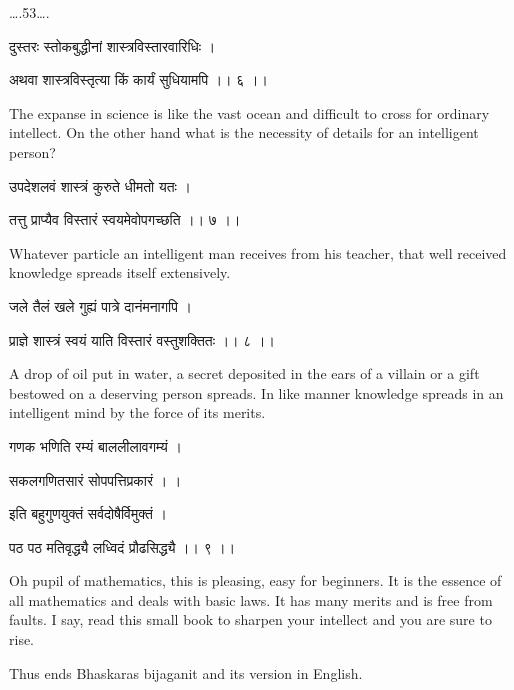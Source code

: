 \documentclass[]{article}
\date{}
\begin{document}
{\ldots{}.53\ldots{}.}

{दुस्तरः स्तोकबुद्धीनां शास्त्रविस्तारवारिधिः । }

{अथवा शास्त्रविस्तृत्या किं कार्यं सुधियामपि ।। ६ ।। }

{The expanse in science is like the vast ocean and difficult to cross
for ordinary intellect. On the other hand what is the necessity of
details for an intelligent person?}

{उपदेशलवं शास्त्रं कुरुते धीमतो यतः । }

{तत्तु प्राप्यैव विस्तारं स्वयमेवोपगच्छति ।। ७ ।। }

{Whatever particle an intelligent man receives from his teacher, that
well received knowledge spreads itself extensively.}

{जले तैलं खले गुह्यं पात्रे दानंमनागपि । }

{प्राज्ञे शास्त्रं स्वयं याति विस्तारं वस्तुशक्तितः ।। ८ ।। }

{A drop of oil put in water, a secret deposited in the ears of a villain
or a gift bestowed on a deserving person spreads. In like manner
knowledge spreads in an intelligent mind by the force of its merits.}

{गणक भणिति रम्यं बाललीलावगम्यं । }

{सकलगणितसारं सोपपत्तिप्रकारं । । }

{इति बहुगुणयुक्तं सर्वदोषैर्विमुक्तं । }

{पठ पठ मतिवृद्ध्यै लध्विदं प्रौढसिद्ध्यै ।। ९ ।। }

{Oh pupil of mathematics, this is pleasing, easy for beginners. It is
the essence of all mathematics and deals with basic laws. It has many
merits and is free from faults. I say, read this small book to sharpen
your intellect and you are sure to rise.}

{Thus ends Bhaskaras bijaganit and its version in English.}
\end{document}
